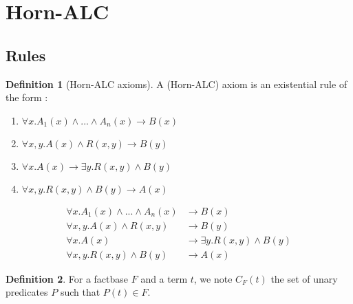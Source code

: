 \documentclass{article}
\theoremstyle{definition}
\newtheorem{definition}{Definition}[section]
\theoremstyle{remark}
\begin{document}
\section{Horn-ALC}

\subsection{Rules}

\begin{definition}[Horn-ALC axioms]
A (Horn-ALC) axiom is an existential rule of the form :
\begin{enumerate}
\item $\forall x.A_1(x) \wedge...\wedge A_n(x) \rightarrow B(x)$
\item $\forall x,y.A(x) \wedge R(x,y) \rightarrow B(y)$
\item $\forall x.A(x) \rightarrow \exists y.R(x,y) \wedge B(y)$
\item $\forall x,y.R(x,y) \wedge B(y) \rightarrow A(x) $
\end{enumerate}
\begin{align}
\forall x.A_1(x) \wedge...\wedge A_n(x) &\rightarrow B(x) \\
\forall x,y.A(x) \wedge R(x,y) &\rightarrow B(y) \\
\forall x.A(x) &\rightarrow \exists y.R(x,y) \wedge B(y) \\
\forall x,y.R(x,y) \wedge B(y) &\rightarrow A(x)
\end{align}
\end{definition}

\begin{definition}
For a factbase $F$ and a term $t$, we note $C_F(t)$ the set of unary predicates $P$ such that $P(t)\in F$.
\end{definition}
\end{document}
